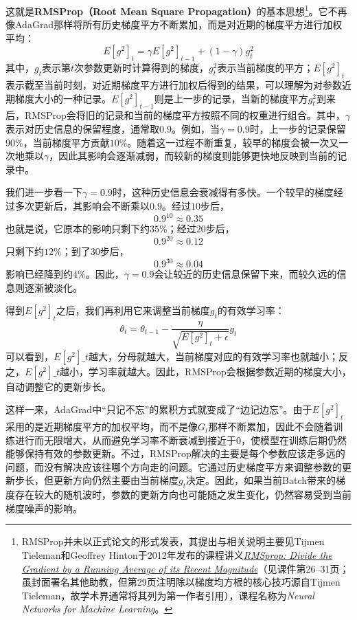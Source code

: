 这就是\textbf{RMSProp（Root Mean Square Propagation）}的基本思想\footnote{RMSProp并未以正式论文的形式发表，其提出与相关说明主要见Tijmen Tieleman和Geoffrey Hinton于2012年发布的课程讲义\href{https://www.cs.toronto.edu/~tijmen/csc321/slides/lecture_slides_lec6.pdf}{\textit{RMSprop: Divide the Gradient by a Running Average of its Recent Magnitude}}（见课件第26–31页；虽封面署名其他助教，但第29页注明除以梯度均方根的核心技巧源自Tijmen Tieleman，故学术界通常将其列为第一作者引用），课程名称为\textit{Neural Networks for Machine Learning}。}。它不再像AdaGrad那样将所有历史梯度平方不断累加，而是对近期的梯度平方进行加权平均：
$$
E[g^2]_t = \gamma E[g^2]_{t-1} + (1-\gamma)g_t^2
$$
其中，$g_t$表示第$t$次参数更新时计算得到的梯度，$g_t^2$表示当前梯度的平方；$E[g^2]_t$表示截至当前时刻，对近期梯度平方进行加权后得到的结果，可以理解为对参数近期梯度大小的一种记录。$E[g^2]_{t-1}$则是上一步的记录，当新的梯度平方$g_t^2$到来后，RMSProp会将旧的记录和当前的梯度平方按照不同的权重进行组合。其中，$\gamma$表示对历史信息的保留程度，通常取$0.9$。例如，当$\gamma=0.9$时，上一步的记录保留$90\%$，当前梯度平方贡献$10\%$。随着这一过程不断重复，较早的梯度会被一次又一次地乘以$\gamma$，因此其影响会逐渐减弱，而较新的梯度则能够更快地反映到当前的记录中。

我们进一步看一下$\gamma=0.9$时，这种历史信息会衰减得有多快。一个较早的梯度经过多次更新后，其影响会不断乘以$0.9$。经过$10$步后，
$$
0.9^{10}\approx0.35
$$
也就是说，它原本的影响只剩下约$35\%$；经过$20$步后，
$$
0.9^{20}\approx0.12
$$
只剩下约$12\%$；到了$30$步后，
$$
0.9^{30}\approx0.04
$$
影响已经降到约$4\%$。因此，$\gamma=0.9$会让较近的历史信息保留下来，而较久远的信息则逐渐被淡化。

得到$E[g^2]_t$之后，我们再利用它来调整当前梯度$g_t$的有效学习率：
$$
\theta_t = \theta_{t-1} - \frac{\eta}{\sqrt{E[g^2]_t+\epsilon}}g_t
$$
可以看到，$E[g^2]\_t$越大，分母就越大，当前梯度对应的有效学习率也就越小；反之，$E[g^2]\_t$越小，学习率就越大。因此，RMSProp会根据参数近期的梯度大小，自动调整它的更新步长。

这样一来，AdaGrad中“只记不忘”的累积方式就变成了“边记边忘”。由于$E[g^2]_t$采用的是近期梯度平方的加权平均，而不是像$G_t$那样不断累加，因此不会随着训练进行而无限增大，从而避免学习率不断衰减到接近于$0$，使模型在训练后期仍然能够保持有效的参数更新。不过，RMSProp解决的主要是每个参数应该走多远的问题，而没有解决应该往哪个方向走的问题。它通过历史梯度平方来调整参数的更新步长，但更新方向仍然主要由当前梯度$g_t$决定。因此，如果当前Batch带来的梯度存在较大的随机波时，参数的更新方向也可能随之发生变化，仍然容易受到当前梯度噪声的影响。

